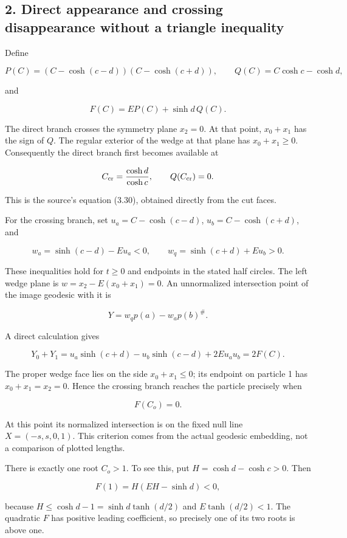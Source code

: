 \documentclass[11pt]{article}
\begin{document}
\subsection{2. Direct appearance and crossing disappearance without a
triangle
inequality}\label{direct-appearance-and-crossing-disappearance-without-a-triangle-inequality}

Define

\[
 P(C)=(C-\cosh(c-d))(C-\cosh(c+d)),\qquad
 Q(C)=C\cosh c-\cosh d,
\]

and

\[
 F(C)=E P(C)+\sinh d\,Q(C).
\]

The direct branch crosses the symmetry plane \(x_2=0\). At that point,
\(x_0+x_1\) has the sign of \(Q\). The regular exterior of the wedge at
that plane has \(x_0+x_1\ge0\). Consequently the direct branch first
becomes available at

\[
 C_{\rm cr}=\frac{\cosh d}{\cosh c},\qquad Q(C_{\rm cr})=0.
\]

This is the source's equation (3.30), obtained directly from the cut
faces.

For the crossing branch, set \(u_a=C-\cosh(c-d)\), \(u_b=C-\cosh(c+d)\),
and

\[
 w_a=\sinh(c-d)-Eu_a<0,\qquad
 w_q=\sinh(c+d)+Eu_b>0.
\]

These inequalities hold for \(t\ge0\) and endpoints in the stated half
circles. The left wedge plane is \(w=x_2-E(x_0+x_1)=0\). An unnormalized
intersection point of the image geodesic with it is

\[
 Y=w_q p(a)-w_a p(b)^\#.
\]

A direct calculation gives

\[
 Y_0+Y_1
 =u_a\sinh(c+d)-u_b\sinh(c-d)+2Eu_au_b
 =2F(C).
\]

The proper wedge face lies on the side \(x_0+x_1\le0\); its endpoint on
particle 1 has \(x_0+x_1=x_2=0\). Hence the crossing branch reaches the
particle precisely when

\[
 F(C_o)=0.
\]

At this point its normalized intersection is on the fixed null line
\(X=(-s,s,0,1)\). This criterion comes from the actual geodesic
embedding, not a comparison of plotted lengths.

There is exactly one root \(C_o>1\). To see this, put
\(H=\cosh d-\cosh c>0\). Then

\[
 F(1)=H(EH-\sinh d)<0,
\]

because \(H\le\cosh d-1=\sinh d\tanh(d/2)\) and \(E\tanh(d/2)<1\). The
quadratic \(F\) has positive leading coefficient, so precisely one of
its two roots is above one.
\end{document}
